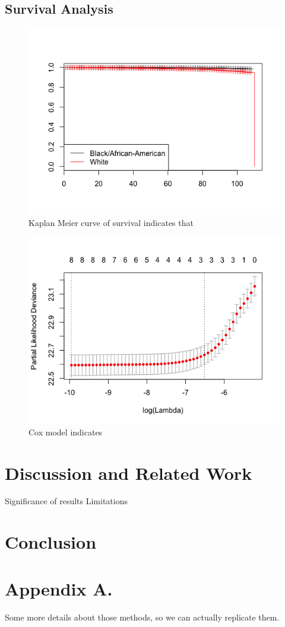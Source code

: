 \documentclass[twoside,10.5pt]{article}
\begin{document}
\subsection{Survival Analysis}
\begin{figure}[htp]
\centering
\includegraphics[width=12cm]{images/Race_KaplanMeier.png}
\caption{Kaplan Meier curve of survival indicates that }
\label{fig:lion}
\end{figure}

\begin{figure}[htp]
\centering
\includegraphics[width=12cm]{images/Coxmodel.png}
\caption{Cox model indicates}
\label{fig:lion}
\end{figure}

\section{Discussion and Related Work}
Significance of results
Limitations 

\section{Conclusion}

\newpage
\appendix
\section*{Appendix A.}
Some more details about those methods, so we can actually replicate them.

\newpage
\theendnotes


\end{document}
